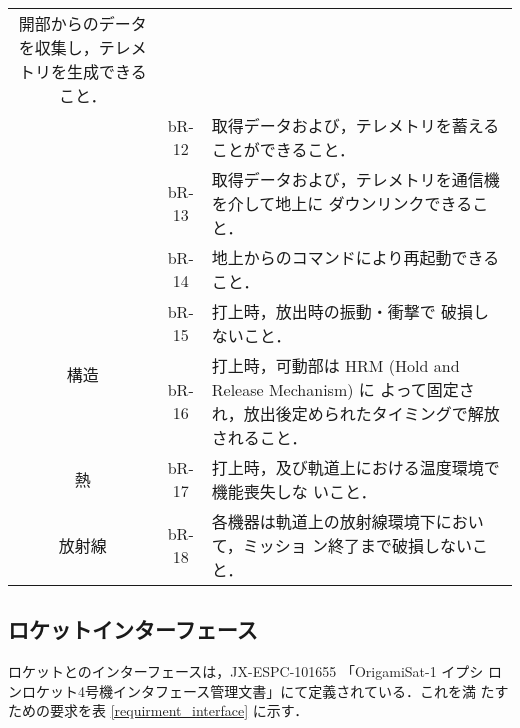 \begin{table}[htb]
\begin{tabular}{|c|c|p{11cm}|}
         開部からのデータを収集し，テレメトリを生成できること．\\ \cline{2-3}
        & bR-12 & 取得データおよび，テレメトリを蓄えることができること．\\ \cline{2-3}
         & bR-13 & 取得データおよび，テレメトリを通信機を介して地上に
         ダウンリンクできること．\\ \cline{2-3}
         & bR-14 & 地上からのコマンドにより再起動できること．\\ \hline
         \multirow{2}{*}{構造} & bR-15 & 打上時，放出時の振動・衝撃で
         破損しないこと．\\ \cline{2-3}
        & bR-16 & 打上時，可動部は HRM (Hold and Release Mechanism) に
         よって固定され，放出後定められたタイミングで解放されること．
         \\ \hline
         熱 & bR-17 & 打上時，及び軌道上における温度環境で機能喪失しな
         いこと．\\ \hline
         放射線 & bR-18 & 各機器は軌道上の放射線環境下において，ミッショ
         ン終了まで破損しないこと．\\ \hline
    \end{tabular}
    \label{requirment_bus}
\end{table}

\subsection{ロケットインターフェース}

ロケットとのインターフェースは，JX-ESPC-101655 「OrigamiSat-1 \/ イプシ
ロンロケット4号機インタフェース管理文書」にて定義されている．これを満
たすための要求を表 \ref{requirment_interface} に示す．


